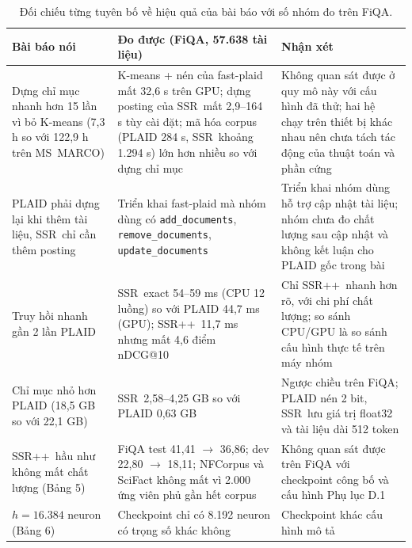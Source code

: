 \documentclass[a4paper,13pt]{extreport}
\makeatletter
\theoremstyle{plain}
\newcommand{\ssr}{SSR}
\newcommand{\ssrpp}{SSR++}
\newcommand{\ndcg}{nDCG@10}
\makeatother
\begin{document}
\begin{table}[htbp]
\centering
\caption{Đối chiếu từng tuyên bố về hiệu quả của bài báo với số nhóm đo trên FiQA.}
\label{tab:claims}
\footnotesize
\begin{tabular}{P{3.6cm}P{5.6cm}P{4.2cm}}
\toprule
\textbf{Bài báo nói} & \textbf{Đo được (FiQA, 57.638 tài liệu)} & \textbf{Nhận xét}\\
\midrule
Dựng chỉ mục nhanh hơn 15 lần vì bỏ K-means (7,3 h so với 122,9 h trên MS~MARCO) & K-means + nén của fast-plaid mất 32,6 s trên GPU; dựng posting của \ssr\ mất 2,9--164 s tùy cài đặt; mã hóa corpus (PLAID 284 s, \ssr\ khoảng 1.294 s) lớn hơn nhiều so với dựng chỉ mục & Không quan sát được ở quy mô này với cấu hình đã thử; hai hệ chạy trên thiết bị khác nhau nên chưa tách tác động của thuật toán và phần cứng\\
PLAID phải dựng lại khi thêm tài liệu, \ssr\ chỉ cần thêm posting & Triển khai fast-plaid mà nhóm dùng có \texttt{add\_documents}, \texttt{remove\_documents}, \texttt{update\_documents} & Triển khai nhóm dùng hỗ trợ cập nhật tài liệu; nhóm chưa đo chất lượng sau cập nhật và không kết luận cho PLAID gốc trong bài\\
Truy hồi nhanh gần 2 lần PLAID & \ssr\ exact 54--59 ms (CPU 12 luồng) so với PLAID 44,7 ms (GPU); \ssrpp\ 11,7 ms nhưng mất 4,6 điểm \ndcg & Chỉ \ssrpp\ nhanh hơn rõ, với chi phí chất lượng; so sánh CPU/GPU là so sánh cấu hình thực tế trên máy nhóm\\
Chỉ mục nhỏ hơn PLAID (18,5 GB so với 22,1 GB) & \ssr\ 2,58--4,25 GB so với PLAID 0,63 GB & Ngược chiều trên FiQA; PLAID nén 2 bit, \ssr\ lưu giá trị float32 và tài liệu dài 512 token\\
\ssrpp\ hầu như không mất chất lượng (Bảng 5) & FiQA test 41,41 $\to$ 36,86; dev 22,80 $\to$ 18,11; NFCorpus và SciFact không mất vì 2.000 ứng viên phủ gần hết corpus & Không quan sát được trên FiQA với checkpoint công bố và cấu hình Phụ lục D.1\\
$h=16.384$ neuron (Bảng 6) & Checkpoint chỉ có 8.192 neuron có trọng số khác không & Checkpoint khác cấu hình mô tả\\
\bottomrule
\end{tabular}
\end{table}
\end{document}
